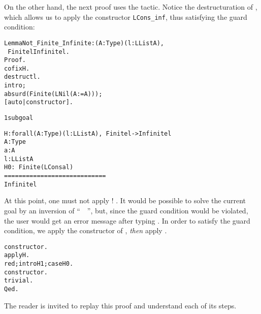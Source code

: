 \documentclass[11pt]{article}
\begin{document}
On the other hand, the next proof uses the  tactic. 
Notice the destructuration of , which allows us to
apply  the constructor \texttt{LCons\_inf}, thus  satisfying
 the guard condition: 
\begin{alltt}
Lemma Not_Finite_Infinite : {\prodsym} (A:Type)(l:LList A),
                            ~ Finite l {\arrow} Infinite l.
Proof.
 cofix H.
 destruct l.
 intro; 
  absurd (Finite (LNil (A:=A)));
  [auto|constructor].
\it




1 subgoal
  
  H : forall (A : Type) (l : LList A), ~ Finite l -> Infinite l
  A : Type
  a : A
  l : LList A
  H0 : ~ Finite (LCons a l)
  ============================
   Infinite l
\end{alltt}
At this point, one must not apply ! . It would be possible
to solve the current goal by an inversion of ``~~'', but, since the guard condition would be violated, the user
would get an error message after typing .
In order to satisfy the guard condition, we apply the constructor of
, \emph{then} apply .

\begin{alltt}
 constructor.
 apply H.
 red; intro H1;case H0.
 constructor.
 trivial.
Qed.
\end{alltt}




The reader is invited to replay this proof and understand each of its steps.




\end{document}
